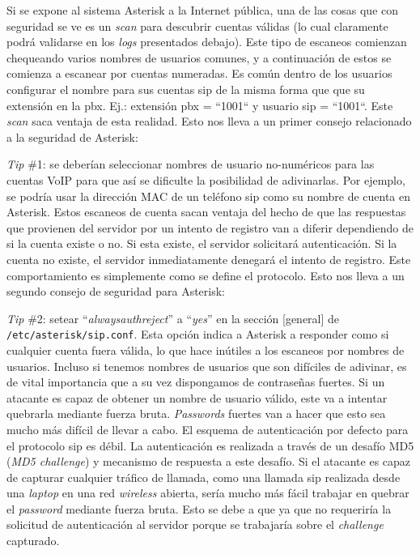 \documentclass[a4paper,12pt]{report}
\begin{document}
{Si se expone al sistema Asterisk a la Internet pública, una de las cosas que
con seguridad se ve es un \emph{scan} para descubrir cuentas válidas (lo cual
claramente podrá validarse en los \emph{logs} presentados debajo). Este tipo de
escaneos comienzan chequeando varios nombres de usuarios comunes, y a
continuación de estos se comienza a escanear por cuentas numeradas. Es común
dentro de los usuarios configurar el nombre para sus cuentas \ac{sip} de la misma forma que
que su extensión en la \ac{pbx}. Ej.: extensión \ac{pbx} = ``1001`` y usuario \ac{sip} = ``1001``. 
Este \emph{scan} saca ventaja de esta realidad. Esto nos
lleva a un primer consejo relacionado a la seguridad de Asterisk:

\emph{Tip} \#1: se deberían seleccionar nombres de usuario no-numéricos para las
cuentas VoIP para que así se dificulte la posibilidad de adivinarlas. Por
ejemplo, se podría usar la dirección MAC de un teléfono \ac{sip} como su nombre de
cuenta en Asterisk. Estos escaneos de cuenta sacan ventaja del hecho de que las
respuestas que provienen del servidor por un intento de registro van a diferir
dependiendo de si la cuenta existe o no. Si esta existe, el servidor solicitará
autenticación. Si la cuenta no existe, el servidor inmediatamente denegará el
intento de registro. Este comportamiento es simplemente como se define el
protocolo. Esto nos lleva a un segundo consejo de seguridad para Asterisk: 

\emph{Tip} \#2: setear ``\emph{alwaysauthreject}'' a ``\emph{yes}'' en la
sección [general] de \\
\texttt{/etc/asterisk/sip.conf}. Esta opción indica a Asterisk a
responder como si cualquier cuenta fuera válida, lo que hace inútiles a los
escaneos por nombres de usuarios. Incluso si tenemos nombres de usuarios que
son difíciles de adivinar, es de vital importancia que a su vez dispongamos de
contraseñas fuertes. Si un atacante es capaz de obtener un nombre de usuario
válido, este va a intentar quebrarla mediante fuerza bruta. \emph{Passwords} fuertes
van a hacer que esto sea mucho más difícil de llevar a cabo.
El esquema de autenticación por defecto para el protocolo \ac{sip} es débil. La
autenticación es realizada a través de un desafío MD5 (\emph{MD5 challenge}) y
mecanismo de respuesta a este desafío. Si el atacante es capaz de capturar
cualquier tráfico de llamada, como una llamada \ac{sip} realizada desde una
\emph{laptop} en una red \emph{wireless} abierta, sería mucho más fácil trabajar en quebrar
el \emph{password} mediante fuerza bruta. Esto se debe a que ya que no requeriría la
solicitud de autenticación al servidor porque se trabajaría sobre el \emph{challenge}
capturado. 

}
\end{document}
